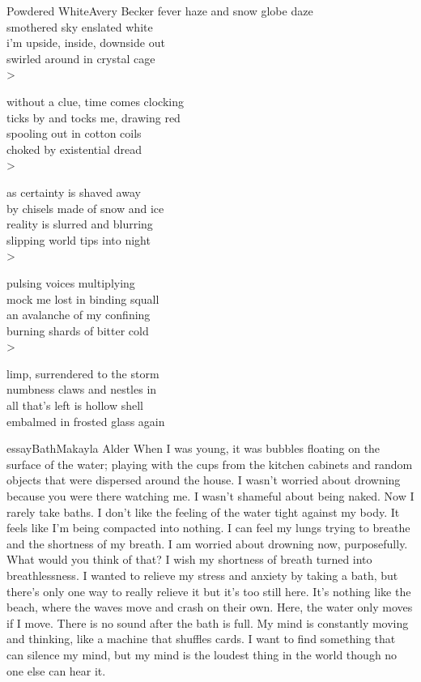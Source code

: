 \begin{poetry}{Powdered White}{Avery Becker}
fever haze and snow globe daze\\
smothered sky enslated white\\
i'm upside, inside, downside out\\
swirled around in crystal cage\\>

without a clue, time comes clocking\\
ticks by and tocks me, drawing red\\
spooling out in cotton coils\\
choked by existential dread\\>

as certainty is shaved away\\
by chisels made of snow and ice\\
reality is slurred and blurring\\
slipping world tips into night\\>

pulsing voices multiplying\\
mock me lost in binding squall\\
an avalanche of my confining\\
burning shards of bitter cold\\>

limp, surrendered to the storm\\
numbness claws and nestles in\\
all that's left is hollow shell\\
embalmed in frosted glass again
\end{poetry}

\begin{prose}{essay}{Bath}{Makayla Alder}
When I was young, it was bubbles floating on the surface of the water; playing with the cups from the kitchen cabinets and random objects that were dispersed around the house. I wasn't worried about drowning because you were there watching me. I wasn't shameful about being naked. Now I rarely take baths. I don't like the feeling of the water tight against my body. It feels like I'm being compacted into nothing. I can feel my lungs trying to breathe and the shortness of my breath. I am worried about drowning now, purposefully. What would you think of that? I wish my shortness of breath turned into breathlessness. I wanted to relieve my stress and anxiety by taking a bath, but there's only one way to really relieve it but it's too still here. It's nothing like the beach, where the waves move and crash on their own. Here, the water only moves if I move. There is no sound after the bath is full. My mind is constantly moving and thinking, like a machine that shuffles cards. I want to find something that can silence my mind, but my mind is the loudest thing in the world though no one else can hear it.
\end{prose}


